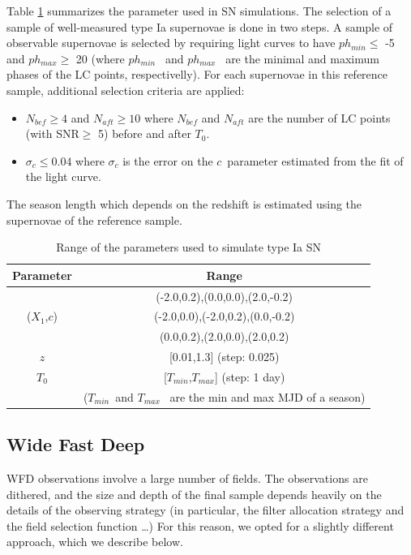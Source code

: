\documentclass [11pt,a4paper]{article}
\newcommand{\strech}{$X_1$}
\newcommand{\sncolor}{$c$}
\newcommand{\daymax}{$T_0$}
\newcommand{\redshift}{$z$}
\newcommand{\tmin}{$T_{min}$}
\newcommand{\tmax}{$T_{max}$}
\newcommand{\phasemin}{$ph_{min}$}
\newcommand{\phasemax}{$ph_{max}$}
\begin{document}
Table \ref{tab:sim_ddf} summarizes the parameter used in SN simulations. The selection of a sample of well-measured type Ia supernovae is done in two steps. A sample of observable supernovae is selected by requiring light curves to have \phasemin $\leq$ -5 and \phasemax $\geq$ 20 (where \phasemin~ and \phasemax~ are the minimal and maximum phases of the LC points, respectivelly). For each supernovae in this reference sample, additional selection criteria are applied:
\begin{itemize}
\item $N_{bef} \geq 4$ and $N_{aft} \geq 10$ where $N_{bef}$ and $N_{aft}$ are the number of LC points (with SNR$\geq$ 5) before and after \daymax.
 \item $\sigma_c \leq 0.04$ where $\sigma_c$ is the error on the \sncolor~parameter estimated from the fit of the light curve.
\end{itemize}
The season length which depends on the redshift is estimated using the supernovae of the reference sample.

\begin{table}[!htbp]
\begin{center}
\begin{tabular}{|c|c|}
\hline
Parameter & Range \\
\hline
                    & (-2.0,0.2),(0.0,0.0),(2.0,-0.2) \\
 (\strech,\sncolor) & (-2.0,0.0),(-2.0,0.2),(0.0,-0.2) \\
                    & (0.0,0.2),(2.0,0.0),(2.0,0.2) \\
\hline
\redshift           & [0.01,1.3] (step: 0.025) \\
\hline
\daymax             & [\tmin,\tmax] (step: 1 day) \\
                    & (\tmin~and \tmax~ are the min and max MJD of a season) \\
                    \hline
\end{tabular}
\caption{Range of the parameters used to simulate type Ia SN}\label{tab:sim_ddf}
\end{center}
\end{table}


\subsection{Wide Fast Deep}
\label{sec:wide_fast_deep_analysis_method}
WFD observations involve a large number of fields.  The observations
are dithered, and the size and depth of the final sample depends
heavily on the details of the observing strategy (in particular, the
filter allocation strategy and the field selection function \ldots)
For this reason, we opted for a slightly different approach, which we
describe below.
\end{document}
